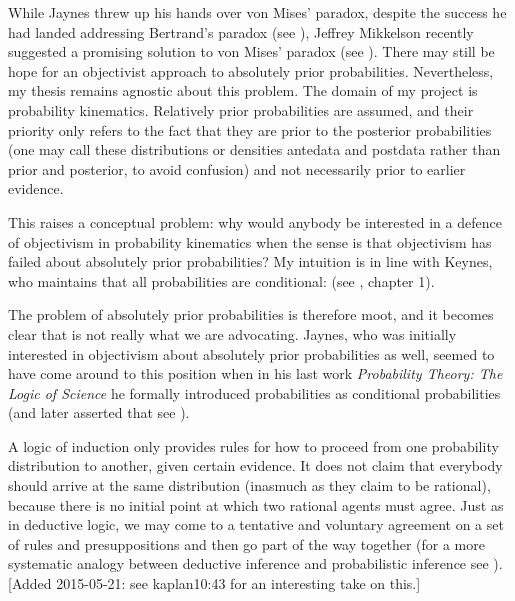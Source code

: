 \documentclass[11pt]{article}
\begin{document}
While Jaynes threw up his hands over von Mises' paradox, despite the
success he had landed addressing Bertrand's paradox (see
), Jeffrey Mikkelson recently suggested a
promising solution to von Mises' paradox (see
). There may still be hope for an objectivist
approach to absolutely prior probabilities. Nevertheless, my thesis
remains agnostic about this problem. The domain of my project is
probability kinematics. Relatively prior probabilities are assumed,
and their priority only refers to the fact that they are prior to the
posterior probabilities (one may call these distributions or densities
antedata and postdata rather than prior and posterior, to avoid
confusion) and not necessarily prior to earlier evidence.

This raises a conceptual problem: why would anybody be interested in a
defence of objectivism in probability kinematics when the sense is
that objectivism has failed about absolutely prior probabilities? My
intuition is in line with Keynes, who maintains that all probabilities
are conditional:  (see
, chapter 1).

The problem of absolutely prior probabilities is therefore moot, and
it becomes clear that  is not really what we are
advocating. Jaynes, who was initially interested in objectivism about
absolutely prior probabilities as well, seemed to have come around to
this position when in his last work \emph{Probability Theory: The
  Logic of Science} he formally introduced probabilities as
conditional probabilities (and later asserted that  see
). 

A logic of induction only provides rules for how to proceed from one
probability distribution to another, given certain evidence. It does
not claim that everybody should arrive at the same distribution
(inasmuch as they claim to be rational), because there is no initial
point at which two rational agents must agree. Just as in deductive
logic, we may come to a tentative and voluntary agreement on a set of
rules and presuppositions and then go part of the way together (for a
more systematic analogy between deductive inference and probabilistic
inference see ). [Added 2015-05-21: see
kaplan10:43 for an interesting take on this.]
\end{document}
